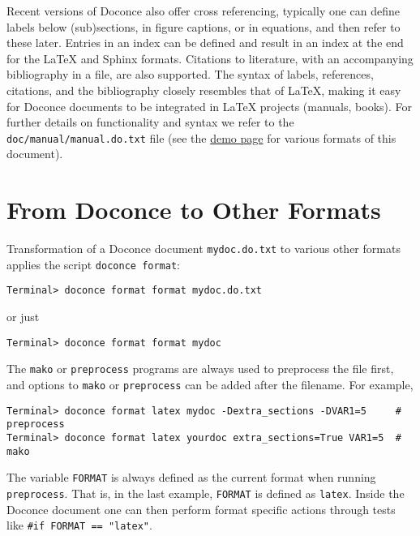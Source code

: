 \documentclass[twoside]{article}
\begin{document}
Recent versions of Doconce also offer cross referencing, typically one
can define labels below (sub)sections, in figure captions, or in
equations, and then refer to these later. Entries in an index can be
defined and result in an index at the end for the {\LaTeX} and Sphinx
formats. Citations to literature, with an accompanying bibliography in
a file, are also supported. The syntax of labels, references,
citations, and the bibliography closely resembles that of {\LaTeX},
making it easy for Doconce documents to be integrated in {\LaTeX}
projects (manuals, books). For further details on functionality and
syntax we refer to the {\fontsize{10pt}{10pt}\verb!doc/manual/manual.do.txt!} file (see the
\href{{https://doconce.googlecode.com/hg/doc/demos/manual/index.html}}{demo page}
for various formats of this document).




\section{From Doconce to Other Formats}

\label{doconce2formats}

Transformation of a Doconce document {\fontsize{10pt}{10pt}\verb!mydoc.do.txt!} to various other
formats applies the script {\fontsize{10pt}{10pt}\verb!doconce format!}:
\vspace{4pt}
\begin{Verbatim}[numbers=none,frame=lines,label=\fbox{{\tiny Terminal}},fontsize=\fontsize{9pt}{9pt},
labelposition=topline,framesep=2.5mm,framerule=0.7pt]
Terminal> doconce format format mydoc.do.txt
\end{Verbatim}
or just
\vspace{4pt}
\begin{Verbatim}[numbers=none,frame=lines,label=\fbox{{\tiny Terminal}},fontsize=\fontsize{9pt}{9pt},
labelposition=topline,framesep=2.5mm,framerule=0.7pt]
Terminal> doconce format format mydoc
\end{Verbatim}
The {\fontsize{10pt}{10pt}\verb!mako!} or {\fontsize{10pt}{10pt}\verb!preprocess!} programs are always used to preprocess the
file first, and options to {\fontsize{10pt}{10pt}\verb!mako!} or {\fontsize{10pt}{10pt}\verb!preprocess!} can be added after the
filename. For example,
\vspace{4pt}
\begin{Verbatim}[numbers=none,frame=lines,label=\fbox{{\tiny Terminal}},fontsize=\fontsize{9pt}{9pt},
labelposition=topline,framesep=2.5mm,framerule=0.7pt]
Terminal> doconce format latex mydoc -Dextra_sections -DVAR1=5     # preprocess
Terminal> doconce format latex yourdoc extra_sections=True VAR1=5  # mako
\end{Verbatim}
The variable {\fontsize{10pt}{10pt}\verb!FORMAT!} is always defined as the current format when
running {\fontsize{10pt}{10pt}\verb!preprocess!}. That is, in the last example, {\fontsize{10pt}{10pt}\verb!FORMAT!} is
defined as {\fontsize{10pt}{10pt}\verb!latex!}. Inside the Doconce document one can then perform
format specific actions through tests like {\fontsize{10pt}{10pt}\verb!#if FORMAT == "latex"!}.
\end{document}
